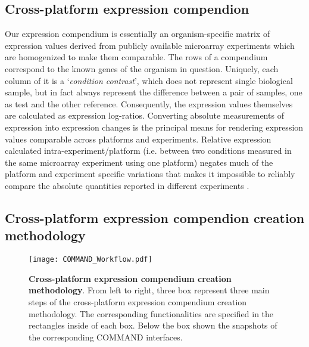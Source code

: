 \subsection{Cross-platform expression compendion}

Our expression compendium is essentially an organism-specific matrix of 
expression values derived from publicly available microarray experiments which 
are homogenized to make them comparable. 
The rows of a compendium correspond to the known genes of the organism 
in question. 
Uniquely, each column of it is a `\textit{condition contrast}', which 
does not represent single biological sample, but in fact always represent the 
difference between a pair of samples, one as test and the other reference. 
Consequently, the expression values themselves are calculated as expression 
log-ratios. 
Converting absolute measurements of expression into expression changes is the 
principal means for rendering expression values comparable across platforms and 
experiments. 
Relative expression calculated intra-experiment/platform (i.e. between two 
conditions measured in the same microarray experiment using one platform) 
negates much of the platform and experiment specific variations that makes it 
impossible to reliably compare the absolute quantities reported in different 
experiments \cite{Shi2006}.



\subsection{Cross-platform expression compendion creation methodology}
\label{sec:colombos-comp-method}

\begin{figure}
	\centering
  	\texttt{[image: COMMAND\_Workflow.pdf]}
  	\caption[Cross-platform expression compendium creation methodology]{
  	\textbf{Cross-platform expression compendium creation methodology}.
  	 From left to right, three box represent three main steps of the 
  	 cross-platform expression compendium creation methodology. The 
  	 corresponding functionalities are specified in the rectangles inside of 
  	 each box. Below the box shown the snapshots of the corresponding COMMAND 
  	 interfaces.}
  	\label{fig:command-workflow}
\end{figure}


